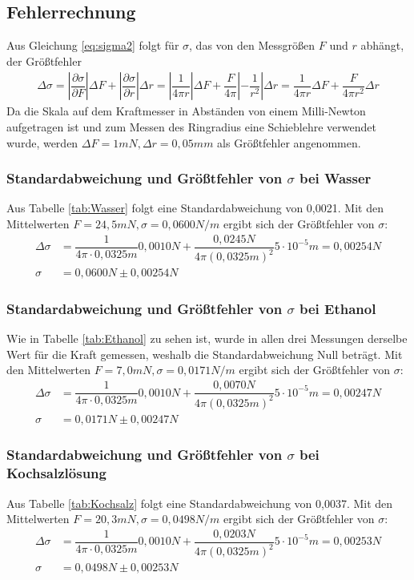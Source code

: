 \documentclass{scrartcl}
\begin{document}
\subsection{Fehlerrechnung}
Aus Gleichung \ref{eq:sigma2} folgt für $\sigma$, das von den Messgrößen $F$ und $r$ abhängt, der Größtfehler
\begin{align*}
\Delta \sigma = \left| \dfrac{\partial \sigma}{\partial F} \right| \Delta F + \left| \dfrac{\partial \sigma}{\partial r} \right| \Delta r = \left| \dfrac{1}{4 \pi r} \right| \Delta F + \dfrac{F}{4 \pi} \left| - \dfrac{1}{r^2} \right| \Delta r =\dfrac{1}{4 \pi r} \Delta F + \dfrac{F}{4 \pi r^2} \Delta r
\end{align*}
Da die Skala auf dem Kraftmesser in Abständen von einem Milli-Newton aufgetragen ist und zum Messen des Ringradius eine Schieblehre verwendet wurde, werden $\Delta F = 1mN, \Delta r = 0,05mm$ als Größtfehler angenommen.

\subsubsection{Standardabweichung und Größtfehler von $\sigma$ bei Wasser}
Aus Tabelle \ref{tab:Wasser} folgt eine Standardabweichung von 0,0021. Mit den Mittelwerten $F = 24,5mN, \sigma = 0,0600N/m$ ergibt sich der Größtfehler von $\sigma$:
\begin{align*}
\Delta \sigma & = \dfrac{1}{4 \pi \cdot 0,0325m} 0,0010N + \dfrac{0,0245N}{4 \pi (0,0325m)^2} 5 \cdot 10^{-5}m = 0,00254N \\
\sigma & = 0,0600N \pm 0,00254N
\end{align*}
\subsubsection{Standardabweichung und Größtfehler von $\sigma$ bei Ethanol}
Wie in Tabelle \ref{tab:Ethanol} zu sehen ist, wurde in allen drei Messungen derselbe Wert für die Kraft gemessen, weshalb die Standardabweichung Null beträgt. Mit den Mittelwerten $F = 7,0mN, \sigma = 0,0171N/m$ ergibt sich der Größtfehler von $\sigma$:
\begin{align*}
\Delta \sigma & = \dfrac{1}{4 \pi \cdot 0,0325m} 0,0010N + \dfrac{0,0070N}{4 \pi (0,0325m)^2} 5 \cdot 10^{-5}m = 0,00247N \\
\sigma & = 0,0171N \pm 0,00247N
\end{align*}
\subsubsection{Standardabweichung und Größtfehler von $\sigma$ bei Kochsalzlösung}
Aus Tabelle \ref{tab:Kochsalz} folgt eine Standardabweichung von 0,0037. Mit den Mittelwerten $F = 20,3mN, \sigma = 0,0498N/m$ ergibt sich der Größtfehler von $\sigma$:
\begin{align*}
\Delta \sigma & = \dfrac{1}{4 \pi \cdot 0,0325m} 0,0010N + \dfrac{0,0203N}{4 \pi (0,0325m)^2} 5 \cdot 10^{-5}m = 0,00253N \\
\sigma & = 0,0498N \pm 0,00253N
\end{align*}
\end{document}
